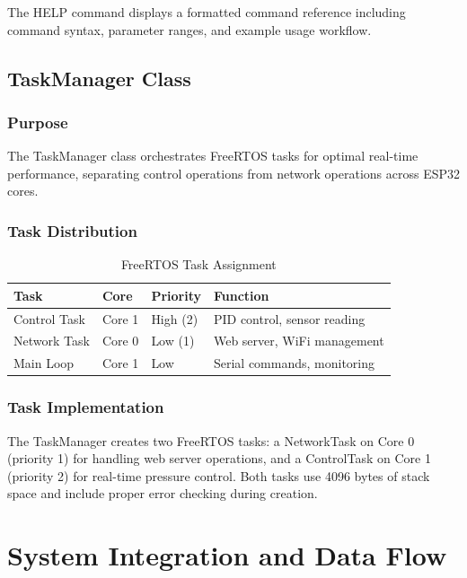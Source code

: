 \documentclass[12pt,a4paper]{article}
\begin{document}
The HELP command displays a formatted command reference including command syntax, parameter ranges, and example usage workflow.

\subsection{TaskManager Class}

\subsubsection{Purpose}
The TaskManager class orchestrates FreeRTOS tasks for optimal real-time performance, separating control operations from network operations across ESP32 cores.

\subsubsection{Task Distribution}
\begin{table}[H]
\centering
\begin{tabular}{@{}llll@{}}
\toprule
\textbf{Task} & \textbf{Core} & \textbf{Priority} & \textbf{Function} \\
\midrule
Control Task & Core 1 & High (2) & PID control, sensor reading \\
Network Task & Core 0 & Low (1) & Web server, WiFi management \\
Main Loop & Core 1 & Low & Serial commands, monitoring \\
\bottomrule
\end{tabular}
\caption{FreeRTOS Task Assignment}
\end{table}

\subsubsection{Task Implementation}
The TaskManager creates two FreeRTOS tasks: a NetworkTask on Core 0 (priority 1) for handling web server operations, and a ControlTask on Core 1 (priority 2) for real-time pressure control. Both tasks use 4096 bytes of stack space and include proper error checking during creation.

\section{System Integration and Data Flow}
\end{document}
